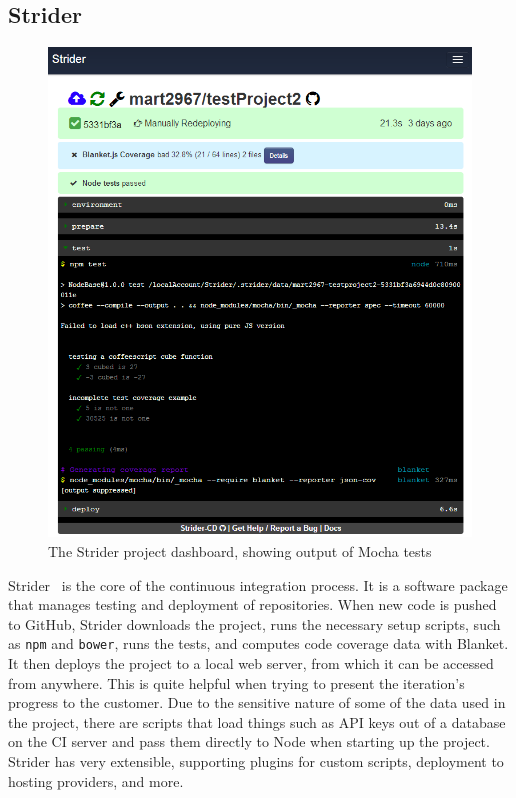 \documentclass[12pt]{article}
\newcommand{\code}[1]{{\texttt {#1}}}
\begin{document}
\subsection{Strider}\label{sec:strider}
\begin{figure}[h!]
\includegraphics[width=\linewidth]{img/strider_2.png}
\caption{The Strider project dashboard, showing output of Mocha tests}
\end{figure}
Strider~\cite{Strider} is the core of the continuous integration process. It is a software package that manages testing and deployment of repositories. When new code is pushed to GitHub, Strider downloads the project, runs the necessary setup scripts, such as \code{npm} and \code{bower}, runs the tests, and computes code coverage data with Blanket. It then deploys the project to a local web server, from which it can be accessed from anywhere. This is quite helpful when trying to present the iteration's progress to the customer. Due to the sensitive nature of some of the data used in the project, there are scripts that load things such as API keys out of a database on the CI server and pass them directly to Node when starting up the project. Strider has very extensible, supporting plugins for custom scripts, deployment to hosting providers, and more.
\end{document}
